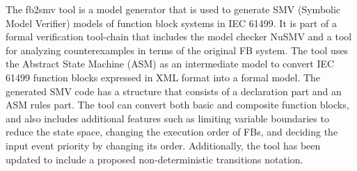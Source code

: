 \documentclass[runningheads]{llncs}
\begin{document}

The fb2smv tool is a model generator that is used to generate SMV (Symbolic Model Verifier) models of function block systems in IEC 61499. It is part of a formal verification tool-chain that includes the model checker NuSMV and a tool for analyzing counterexamples in terms of the original FB system. The tool uses the Abstract State Machine (ASM) as an intermediate model to convert IEC 61499 function blocks expressed in XML format into a formal model. The generated SMV code has a structure that consists of a declaration part and an ASM rules part. The tool can convert both basic and composite function blocks, and also includes additional features such as limiting variable boundaries to reduce the state space, changing the execution order of FBs, and deciding the input event priority by changing its order. Additionally, the tool has been updated to include a proposed non-deterministic transitions notation.
\end{document}
